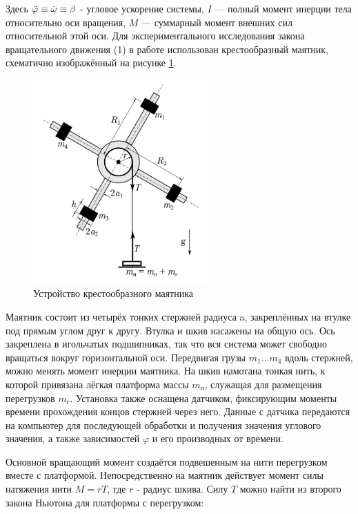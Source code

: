 \documentclass[a4paper,12pt]{article} %
\begin{document}
Здесь $ \Ddot{\varphi} \equiv \Dot{\omega} \equiv \beta $ - угловое ускорение системы, $ I $ — полный
момент инерции тела относительно оси вращения, $ M $ — суммарный
момент внешних сил относительной этой оси. Для экспериментального исследования закона вращательного движения (1) в работе использован крестообразный маятник, схематично изображённый на рисунке \ref{setup}. 

\begin{figure}[h]
    \centering
    \includegraphics[width = 0.6\textwidth]{1.2.2 setup.PNG}
    \caption{Устройство крестообразного маятника}
    \label{setup}
\end{figure}

Маятник состоит из четырёх тонких стержней радиуса a, закреплённых на втулке под прямым углом друг к другу. Втулка и шкив насажены на общую ось. Ось закреплена в игольчатых подшипниках, так что вся система может свободно вращаться вокруг горизонтальной оси. Передвигая грузы $ m_1 \dots m_4 $ вдоль стержней, можно менять момент инерции маятника. На шкив намотана тонкая нить, к которой привязана лёгкая платформа массы $ m_\text{п} $, служащая для размещения перегрузков $ m_\text{г} $. Установка также оснащена датчиком, фиксирующим моменты времени прохождения концов стержней через него. Данные с датчика передаются на компьютер для последующей обработки и получения значения углового значения, а также зависимостей $ \varphi $ и его производных от времени.

Основной вращающий момент создаётся подвешенным на нити перегрузком вместе с платформой. Непосредственно на маятник действует момент силы натяжения нити $ M = rT $, где $ r $ - радиус шкива. Силу $ T $ можно найти из второго закона Ньютона для платформы с перегрузком: 
\end{document}
